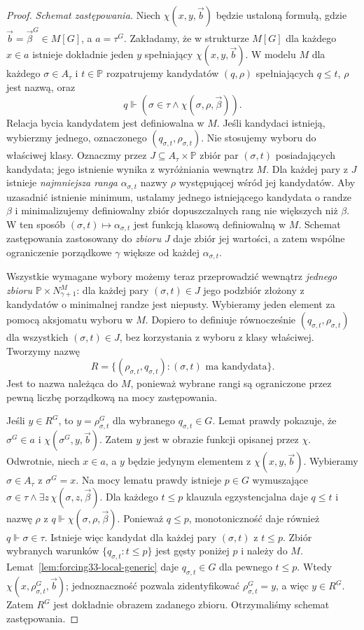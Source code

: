 \begin{proof}
\emph{Schemat zastępowania.}
Niech $\chi(x,y,\vec b)$ będzie
ustaloną formułą, gdzie
$\vec b=\vec\beta^G\in M[G]$,
a $a=\tau^G$. Zakładamy, że
w strukturze $M[G]$ dla każdego
$x\in a$ istnieje dokładnie
jeden $y$ spełniający
$\chi(x,y,\vec b)$.
W modelu $M$ dla każdego
$\sigma\in A_\tau$ i $t\in\mathbb P$
rozpatrujemy kandydatów
$(q,\rho)$ spełniających
$q\leq t$, $\rho$ jest nazwą,
oraz
\[
 q\Vdash(\sigma\in\tau
              \land\chi(\sigma,\rho,\vec\beta)).
\]
Relacja bycia kandydatem jest
definiowalna w $M$. Jeśli
kandydaci istnieją, wybierzmy
jednego, oznaczonego
$(q_{\sigma,t},\rho_{\sigma,t})$.
Nie stosujemy wyboru do właściwej klasy.
Oznaczmy przez $J\subseteq
A_\tau\times\mathbb P$ zbiór par
$(\sigma,t)$ posiadających kandydata;
jego istnienie wynika z wyróżniania
wewnątrz $M$.
Dla każdej pary z $J$ istnieje
\emph{najmniejsza ranga}
$\alpha_{\sigma,t}$ nazwy $\rho$
występującej wśród jej kandydatów.
Aby uzasadnić istnienie minimum,
ustalamy jednego istniejącego kandydata
o randze $\beta$ i minimalizujemy
definiowalny zbiór dopuszczalnych
rang nie większych niż $\beta$.
W ten sposób
$(\sigma,t)\mapsto\alpha_{\sigma,t}$
jest funkcją klasową definiowalną
w $M$. Schemat zastępowania
zastosowany do \emph{zbioru} $J$
daje zbiór jej wartości, a zatem
wspólne ograniczenie porządkowe
$\gamma$ większe od każdej
$\alpha_{\sigma,t}$.

Wszystkie wymagane wybory możemy
teraz przeprowadzić wewnątrz
\emph{jednego zbioru}
$\mathbb P\times N_{\gamma+1}^M$:
dla każdej pary $(\sigma,t)\in J$
jego podzbiór złożony z kandydatów
o minimalnej randze jest niepusty.
Wybieramy jeden element za pomocą
aksjomatu wyboru w $M$.
Dopiero to definiuje równocześnie
$(q_{\sigma,t},\rho_{\sigma,t})$
dla wszystkich $(\sigma,t)\in J$,
bez korzystania z wyboru z klasy właściwej.
Tworzymy nazwę
\[
 R=\{(\rho_{\sigma,t},q_{\sigma,t}):
    (\sigma,t)\text{ ma kandydata}\}.
\]
Jest to nazwa należąca do $M$,
ponieważ wybrane rangi są ograniczone
przez pewną liczbę porządkową
na mocy zastępowania.

Jeśli $y\in R^G$, to
$y=\rho_{\sigma,t}^G$ dla
wybranego $q_{\sigma,t}\in G$.
Lemat prawdy pokazuje, że
$\sigma^G\in a$ i
$\chi(\sigma^G,y,\vec b)$.
Zatem $y$ jest w obrazie
funkcji opisanej przez $\chi$.
Odwrotnie, niech $x\in a$,
a $y$ będzie jedynym elementem
z $\chi(x,y,\vec b)$.
Wybieramy $\sigma\in A_\tau$
z $\sigma^G=x$. Na mocy
lematu prawdy istnieje $p\in G$
wymuszające
$\sigma\in\tau\land
\exists z\,\chi(\sigma,z,\vec\beta)$.
Dla każdego $t\leq p$
klauzula egzystencjalna
daje $q\leq t$ i nazwę $\rho$
z $q\Vdash\chi(\sigma,\rho,\vec\beta)$.
Ponieważ $q\leq p$, monotoniczność
daje również $q\Vdash\sigma\in\tau$.
Istnieje więc kandydat dla
każdej pary $(\sigma,t)$
z $t\leq p$.
Zbiór wybranych warunków
$\{q_{\sigma,t}:t\leq p\}$
jest gęsty poniżej $p$
i należy do $M$.
Lemat~\ref{lem:forcing33-local-generic}
daje $q_{\sigma,t}\in G$
dla pewnego $t\leq p$.
Wtedy
$\chi(x,\rho_{\sigma,t}^G,\vec b)$;
jednoznaczność pozwala
zidentyfikować $\rho_{\sigma,t}^G=y$,
a więc $y\in R^G$.
Zatem $R^G$ jest dokładnie
obrazem zadanego zbioru.
Otrzymaliśmy schemat zastępowania.


\end{proof}
